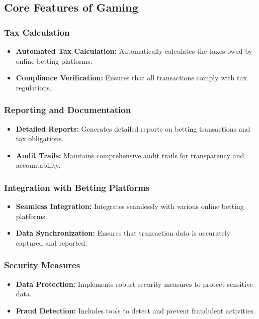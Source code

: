 \documentclass[a4paper,12pt]{report}
\begin{document}
	\subsection{Core Features of Gaming}
	
	\subsubsection{Tax Calculation}
	\begin{itemize}
		\item \textbf{Automated Tax Calculation:} Automatically calculates the taxes owed by online betting platforms.
		\item \textbf{Compliance Verification:} Ensures that all transactions comply with tax regulations.
	\end{itemize}
	
	\subsubsection{Reporting and Documentation}
	\begin{itemize}
		\item \textbf{Detailed Reports:} Generates detailed reports on betting transactions and tax obligations.
		\item \textbf{Audit Trails:} Maintains comprehensive audit trails for transparency and accountability.
	\end{itemize}
	
	\subsubsection{Integration with Betting Platforms}
	\begin{itemize}
		\item \textbf{Seamless Integration:} Integrates seamlessly with various online betting platforms.
		\item \textbf{Data Synchronization:} Ensures that transaction data is accurately captured and reported.
	\end{itemize}
	
	\subsubsection{Security Measures}
	\begin{itemize}
		\item \textbf{Data Protection:} Implements robust security measures to protect sensitive data.
		\item \textbf{Fraud Detection:} Includes tools to detect and prevent fraudulent activities.
	\end{itemize}
	
\end{document}
